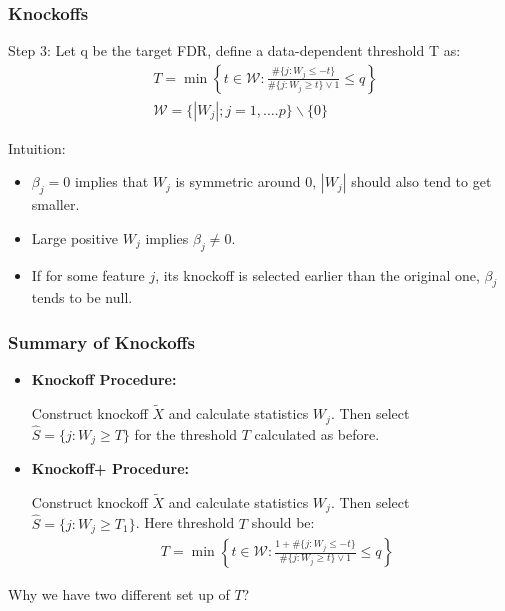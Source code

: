\documentclass{beamer}
\begin{document}
\begin{frame}
\frametitle{Knockoffs}
Step 3: Let q be the target FDR, define a data-dependent threshold T as:
\begin{align*}
& T = \min\left\{t\in \mathcal{W}: \frac{\#\{j: W_j\leq-t\} }{\# \{j: W_j\geq t\}\vee 1 }\leq q \right\} \\
& \mathcal{W} = \{|W_j|; j=1,\dots. p \}\backslash \{0\}
\end{align*}

Intuition: 
\begin{itemize}
\item $\beta_j =0$ implies that $W_j$ is symmetric around 0, $|W_j|$ should also tend to get smaller.
\item Large positive $W_j$ implies $\beta_j\neq 0$. 
\item If for some feature $j$, its knockoff is selected earlier than the original one, $\beta_j$ tends to be null.
\end{itemize}
\end{frame}
\begin{frame}
\frametitle{Summary of Knockoffs}
\begin{itemize}
	\item \textbf{Knockoff Procedure:}
	
	Construct knockoff $\tilde{X}$ and calculate statistics $W_j$. Then select $\hat{S} = \{j: W_j\geq T\}$ for the threshold $T$ calculated as before.
	\item \textbf{Knockoff+ Procedure:}
	
	Construct knockoff $\tilde{X}$ and calculate statistics $W_j$. Then select $\hat{S} = \{j: W_j\geq T_1\}$. Here threshold $T$ should be:
	\begin{align*}
	& T = \min\left\{t\in \mathcal{W}: \frac{1 +\#\{j: W_j\leq-t\} }{\# \{j: W_j\geq t\}\vee 1 }\leq q \right\}
	\end{align*}
\end{itemize}

Why we have two different set up of $T$?
\end{frame}
\end{document}
